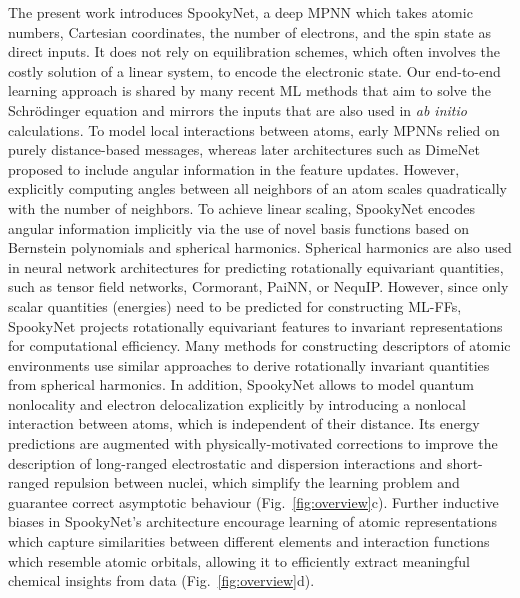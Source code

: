 \documentclass[%
superscriptaddress,
reprint,
nofootinbib,
amsmath,amssymb,amsfonts,
floatfix,
altaffilletter,
showkeys,
]{revtex4-2}
\newcommand{\nn}{SpookyNet}
\begin{document}
The present work introduces \nn{}, a deep MPNN which takes atomic numbers, Cartesian coordinates, the number of electrons, and the spin state as direct inputs. It does not rely on equilibration schemes, which often involves the costly solution of a linear system, to encode the electronic state. Our end-to-end learning approach is shared by many recent ML methods that aim to solve the Schr\"odinger equation\cite{pfau2020ab,hermann2020deep,scherbela2021solving} and mirrors the inputs that are also used in \textit{ab initio} calculations. To model local interactions between atoms, early MPNNs relied on purely distance-based messages,\cite{schutt2017quantum,schutt2018schnet,unke2019physnet} whereas later architectures such as DimeNet\cite{klicpera2020directional} proposed to include angular information in the feature updates. However, explicitly computing angles between all neighbors of an atom scales quadratically with the number of neighbors. To achieve linear scaling, \nn{} encodes angular information implicitly via the use of novel basis functions based on Bernstein polynomials\cite{bernstein1912demo} and spherical harmonics. Spherical harmonics are also used in neural network architectures for predicting rotationally equivariant quantities, such as tensor field networks,\cite{thomas2018tensor} Cormorant,\cite{anderson2019cormorant} PaiNN,\cite{schutt2021equivariant} or NequIP.\cite{batzner2021se} However, since only scalar quantities (energies) need to be predicted for constructing ML-FFs, \nn{} projects rotationally equivariant features to invariant representations for computational efficiency. Many methods for constructing descriptors of atomic environments use similar approaches to derive rotationally invariant quantities from spherical harmonics.\cite{bartok2013representing,thompson2015spectral,unke2018reactive}
In addition, \nn{} allows to model quantum nonlocality and electron delocalization explicitly by introducing a nonlocal interaction between atoms, which is independent of their distance. Its energy predictions are augmented with physically-motivated corrections to improve the description of long-ranged electrostatic and dispersion interactions and short-ranged repulsion between nuclei, which simplify the learning problem and guarantee correct asymptotic behaviour (Fig.~\ref{fig:overview}c). Further inductive biases in \nn{}'s architecture encourage learning of atomic representations which capture similarities between different elements and interaction functions which resemble atomic orbitals, allowing it to efficiently extract meaningful  chemical insights from data (Fig.~\ref{fig:overview}d).
\end{document}
